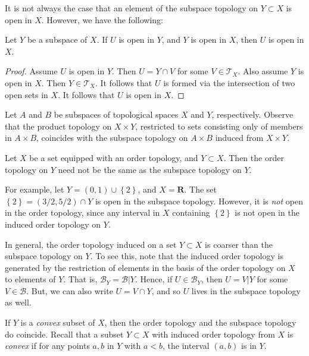 It is not always the case that an element of the subspace topology on $Y \subset
X$ is open in $X$. However, we have the following:
\begin{lemma}
	\label{lem:open-criteria-subspace}
	Let $Y$ be a subspace of $X$. If $U$ is open in $Y$, and $Y$ is open in
	$X$, then $U$ is open in $X$.
\end{lemma}
\begin{proof}
	Assume $U$ is open in $Y$. Then $U = Y \cap V$ for some $V \in
	\mathcal{T}_{X}$. Also assume $Y$ is open in $X$. Then $Y \in \mathcal{T}_{X}$.
	It follows that $U$ is formed via the intersection of two open sets in
	$X$. It follows that $U$ is open in $X$.
\end{proof}
\begin{remark}
	Let $A$ and $B$ be subspaces of topological spaces $X$ and $Y$, respectively.
	Observe that the product topology on $X \times Y$, restricted to sets consisting only
	of members in $A \times B$, coincides with the subspace topology
	on $A \times B$ induced from $X \times Y$.
\end{remark}
\begin{remark}
	Let $X$ be a set equipped with an order topology, and $Y \subset X$.
	Then the order topology on $Y$ need not be the same as the subspace topology on $Y$.
	\par
	For example, let $Y = (0,1) \cup \left\{ 2 \right\}$, and $X = \mathbf{R}$. The set $\left\{ 2 \right\} = (3/2, 5/2) \cap Y$ is open in the subspace
	topology. However, it is \emph{not} open in the order topology, since any
	interval in $X$ containing $\left\{2\right\}$ is not open in the induced order
	topology on $Y$.
	\par
	In general, the order topology induced on a set $Y \subset X$ is coarser than the
	subspace topology on $Y$. To see this, note that the induced order topology is
	generated by the restriction of elements in the basis of the order
	topology on $X$ to elements of $Y$. That is,
	$\mathcal{B}_{Y} = \mathcal{B}| Y$. Hence, if $U \in \mathcal{B}_{Y}$, then
	$U = V | Y$ for some $V \in \mathcal{B}$. But, we can also write $U = V \cap Y$,
	and so $U$ lives in the subspace topology as well.
	\par
	If $Y$ is a \emph{convex} subset of $X$, then the order topology and the subspace
	topology do coincide. Recall that a subset $Y \subset X$ with induced order
	topology from $X$ is \emph{convex} if for any points $a,b$ in $Y$ with $a < b$,
	the interval $(a,b)$ is in $Y$.
\end{remark}
